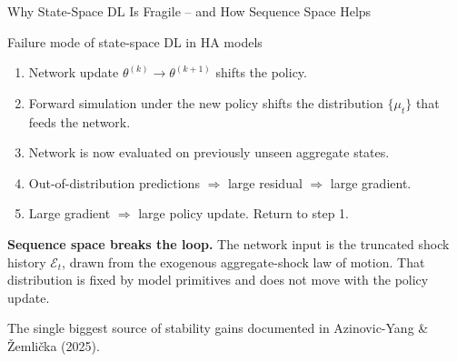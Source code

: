 \documentclass[aspectratio=169,11pt]{beamer}
\newcommand{\emphc}[1]{\textcolor{harvardcrimson}{#1}}
\newcommand{\E}{\mathcal{E}}
\begin{document}
\begin{frame}{Why State-Space DL Is Fragile -- and How Sequence Space Helps}
\small
\begin{alertblock}{Failure mode of state-space DL in HA models}
\begin{enumerate}\itemsep1pt
    \item Network update $\theta^{(k)} \to \theta^{(k+1)}$ shifts the policy.
    \item Forward simulation under the new policy shifts the distribution $\{\mu_t\}$ that feeds the network.
    \item Network is now evaluated on \emphc{previously unseen} aggregate states.
    \item Out-of-distribution predictions $\Rightarrow$ large residual $\Rightarrow$ large gradient.
    \item Large gradient $\Rightarrow$ large policy update.  \emphc{Return to step 1.}
\end{enumerate}
\end{alertblock}

\vspace{0.4em}
\textbf{Sequence space breaks the loop.}  The network input is the truncated shock history $\E_t$, drawn from the \emphc{exogenous} aggregate-shock law of motion.  That distribution is fixed by model primitives and \emphc{does not move} with the policy update.

\vspace{0.4em}
{\footnotesize The single biggest source of stability gains documented in Azinovic-Yang \& \v{Z}emli\v{c}ka (2025).}
\end{frame}


\end{document}
